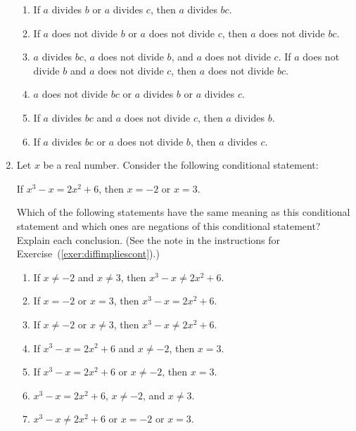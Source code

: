 \begin{enumerate}
\begin{enumerate}
\item If $a$ divides $b$ or $a$ divides $c$, then $a$ divides $bc$.
\item If $a$ does not divide $b$ or $a$ does not divide $c$, then $a$ does not divide $bc$.
\item $a$ divides $bc$, $a$ does not divide $b$, and $a$ does not divide $c$.
\yitem If $a$ does not divide $b$ and $a$ does not divide $c$, then $a$ does not divide $bc$.
\item $a$ does not divide $bc$ or $a$ divides $b$ or $a$ divides $c$.
\item If $a$ divides $bc$ and $a$ does not divide $c$, then $a$ divides $b$.
\item If $a$ divides $bc$ or $a$ does not divide $b$, then $a$ divides $c$.
\end{enumerate}

\item Let $x$  be a real number.  Consider the following conditional statement:

\begin{center}
If  $x^3  - x = 2x^2  + 6$, then  $x =  - 2$  or  $x = 3$.
\end{center}

Which of the following statements have the same meaning as this conditional statement and which ones are negations of this conditional statement?  Explain each conclusion.  (See the note in the instructions for  Exercise~(\ref{exer:diffimpliescont}).)


\begin{enumerate}
\item If  $x \ne  - 2$  and   $x \ne 3$, then  $x^3  - x \ne 2x^2  + 6$.

\item If  $x =  - 2$  or  $x = 3$, then  $x^3  - x = 2x^2  + 6$.

\item If  $x \ne  - 2$ or  $x \ne 3$, then  $x^3  - x \ne 2x^2  + 6$.

\item If  $x^3  - x = 2x^2  + 6$  and  $x \ne  - 2$, then  $x = 3$.

\item If  $x^3  - x = 2x^2  + 6$  or  $x \ne  - 2$, then  $x = 3$.

\item $x^3  - x = 2x^2  + 6$, $x \ne  - 2$, and  $x \ne 3$.

\item $x^3  - x \ne 2x^2  + 6$  or   $x =  - 2$  or  $x = 3$.
\end{enumerate}
\end{enumerate}

